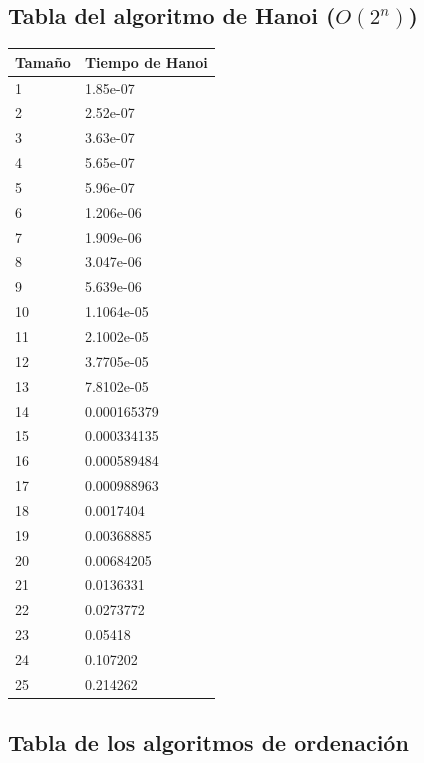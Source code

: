 \documentclass[a4paper, 11pt]{article}
\begin{document}
\subsection{Tabla del algoritmo de Hanoi ($O(2^n)$)}
\begin{tabular}{|l|l|}
	\hline
	Tamaño & Tiempo de Hanoi \\
	\hline
	\hline
1&1.85e-07\\
\hline
2&2.52e-07\\
\hline
3&3.63e-07\\
\hline
4&5.65e-07\\
\hline
5&5.96e-07\\
\hline
6&1.206e-06\\
\hline
7&1.909e-06\\
\hline
8&3.047e-06\\
\hline
9&5.639e-06\\
\hline
10&1.1064e-05\\
\hline
11&2.1002e-05\\
\hline
12&3.7705e-05\\
\hline
13&7.8102e-05\\
\hline
14&0.000165379\\
\hline
15&0.000334135\\
\hline
16&0.000589484\\
\hline
17&0.000988963\\
\hline
18&0.0017404\\
\hline
19&0.00368885\\
\hline
20&0.00684205\\
\hline
21&0.0136331\\
\hline
22&0.0273772\\
\hline
23&0.05418\\
\hline
24&0.107202\\
\hline
25&0.214262\\
\hline

\end{tabular}

\subsection{Tabla de los algoritmos de ordenación}
\end{document}
